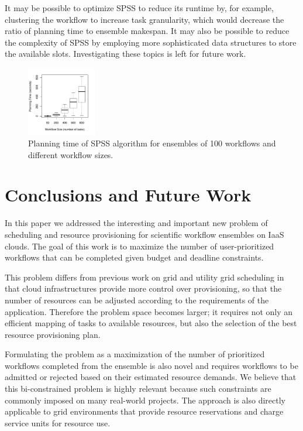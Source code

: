 \documentclass[preprint,5p]{elsarticle}
\begin{document}
It may be possible to optimize SPSS to reduce its runtime by, for example,
clustering the workflow to increase task granularity, which would decrease the
ratio of planning time to ensemble makespan. It may also be possible to reduce
the complexity of SPSS by employing more sophisticated data structures to
store the available slots. Investigating these topics is left for future work.


\begin{figure}[tb]
    \centering
    \vspace{-6mm}
    \includegraphics[width=0.27\textwidth]{spss_planning_time}
    \vspace{-3mm}
    \caption{Planning time of SPSS algorithm for ensembles of 100 workflows and different workflow sizes.}
    \label{fig:spss_planning_time}
\end{figure}

\section{Conclusions and Future Work}
\label{sec:conclusions}

In this paper we addressed the interesting and important new problem of
scheduling and resource provisioning for scientific workflow ensembles on IaaS
clouds. The goal of this work is to maximize the number of user-prioritized
workflows that can be completed given budget and deadline constraints.

This problem differs from previous work on grid and utility grid scheduling
in that cloud infrastructures provide more control over provisioning, so that
the number of resources can be adjusted according to the requirements of the
application. Therefore the problem space becomes larger; it requires not only
an efficient mapping of tasks to available resources, but also the selection
of the best resource provisioning plan.

Formulating the problem as a maximization of the number of prioritized
workflows completed from the ensemble is also novel and requires workflows to
be admitted or rejected based on their estimated resource demands. We believe
that this bi-constrained problem is highly relevant because such constraints
are commonly imposed on many real-world projects. The approach is also
directly applicable to grid environments that provide resource reservations
and charge service units for resource use.
\end{document}
